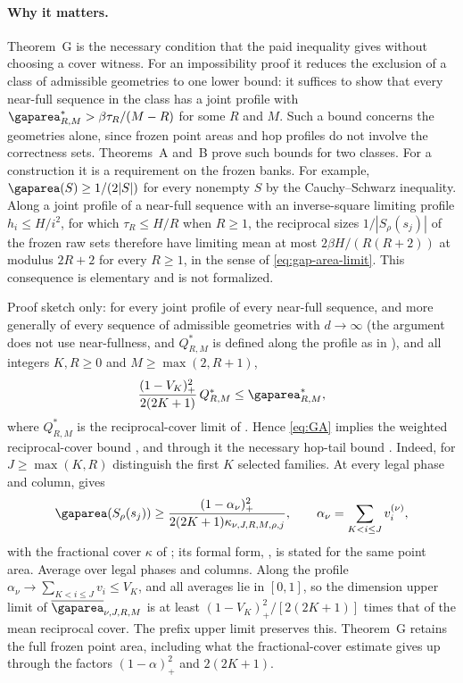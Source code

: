 \paragraph{Why it matters.}
Theorem~G is the necessary condition that the paid inequality gives without choosing a
cover witness. For an impossibility proof it reduces the exclusion of a class of
admissible geometries to one lower bound: it suffices to show that every near-full
sequence in the class has a joint profile with $\limarea_{R,M}>\beta\tau_R/(M-R)$ for
some $R$ and $M$. Such a bound concerns the geometries alone, since frozen point areas
and hop profiles do not involve the correctness sets. Theorems~A and~B prove such
bounds for two classes. For a construction it is a requirement on the frozen banks.
For example, $\gaparea(S)\ge1/(2|S|)$ for every nonempty $S$ by the Cauchy--Schwarz
inequality. Along a joint profile of a near-full sequence with an inverse-square
limiting profile $h_i\le H/i^2$, for which $\tau_R\le H/R$ when $R\ge1$, the reciprocal
sizes $1/|S_\rho(s_j)|$ of the frozen raw sets therefore have limiting mean at most
$2\beta H/(R(R+2))$ at modulus $2R+2$ for every $R\ge1$, in the sense of
\eqref{eq:gap-area-limit}. This consequence is elementary and
is not formalized.

\begin{remark}\label{rem:reciprocal-comparison}
Proof sketch only: for every joint profile of every near-full sequence, and more
generally of every sequence of admissible geometries with $d\to\infty$ (the argument
does not use near-fullness, and $Q^*_{R,M}$ is defined along the profile as in
\cite[(4.7)]{SourceCovers2026}), and all integers $K,R\ge0$ and $M\ge\max(2,R+1)$,
\[
 \frac{(1-V_K)_+^2}{2(2K+1)}\,Q^*_{R,M}\le\limarea_{R,M},
\]
where $Q^*_{R,M}$ is the reciprocal-cover limit of \cite[(4.7)]{SourceCovers2026}.
Hence \eqref{eq:GA} implies the weighted reciprocal-cover bound
\cite[(4.8)]{SourceCovers2026}, and through it the necessary hop-tail bound
\cite[Theorem~4.2]{SourceCovers2026}. Indeed, for $J\ge\max(K,R)$ distinguish the first $K$
selected families. At every legal phase and column, \cite[Lemma~3.3]{SourceCovers2026}
gives
\[
 \gaparea(S_\rho(s_j))\ge\frac{(1-\alpha_\nu)_+^2}{2(2K+1)\kappa_{\nu,J,R,M,\rho,j}},
 \qquad \alpha_\nu=\sum_{K<i\le J}v_i^{(\nu)},
\]
with the fractional cover $\kappa$ of \cite[Definition~3.1]{SourceCovers2026}; its
formal form, , is stated for the same point
area. Average over legal phases and columns. Along the profile
$\alpha_\nu\to\sum_{K<i\le J}v_i\le V_K$, and all averages lie in $[0,1]$, so the
dimension upper limit of $\meanarea_{\nu,J,R,M}$ is at least $(1-V_K)_+^2/[2(2K+1)]$
times that of the mean reciprocal cover. The prefix upper limit preserves this.
Theorem~G retains the full frozen point area, including what the fractional-cover
estimate gives up through the factors $(1-\alpha)_+^2$ and $2(2K+1)$.
\end{remark}
